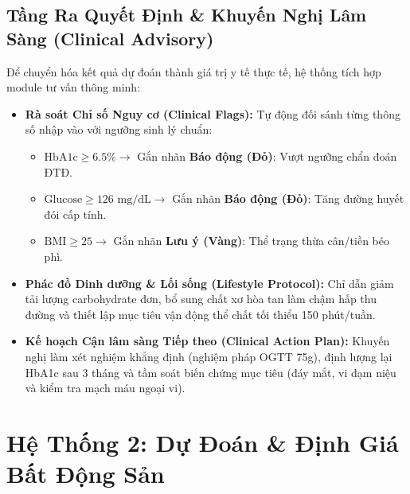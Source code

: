 \documentclass[12pt,a4paper]{report}
\begin{document}
\section{Tầng Ra Quyết Định \& Khuyến Nghị Lâm Sàng (Clinical Advisory)}
Để chuyển hóa kết quả dự đoán thành giá trị y tế thực tế, hệ thống tích hợp module tư vấn thông minh:
\begin{itemize}[leftmargin=2em]
    \item \textbf{Rà soát Chỉ số Nguy cơ (Clinical Flags):} Tự động đối sánh từng thông số nhập vào với ngưỡng sinh lý chuẩn:
    \begin{itemize}
        \item $\text{HbA1c} \ge 6.5\% \rightarrow$ Gắn nhãn \textbf{Báo động (Đỏ)}: Vượt ngưỡng chẩn đoán ĐTĐ.
        \item $\text{Glucose} \ge 126\text{ mg/dL} \rightarrow$ Gắn nhãn \textbf{Báo động (Đỏ)}: Tăng đường huyết đói cấp tính.
        \item $\text{BMI} \ge 25 \rightarrow$ Gắn nhãn \textbf{Lưu ý (Vàng)}: Thể trạng thừa cân/tiền béo phì.
    \end{itemize}
    \item \textbf{Phác đồ Dinh dưỡng \& Lối sống (Lifestyle Protocol):} Chỉ dẫn giảm tải lượng carbohydrate đơn, bổ sung chất xơ hòa tan làm chậm hấp thu đường và thiết lập mục tiêu vận động thể chất tối thiểu 150 phút/tuần.
    \item \textbf{Kế hoạch Cận lâm sàng Tiếp theo (Clinical Action Plan):} Khuyến nghị làm xét nghiệm khẳng định (nghiệm pháp OGTT 75g), định lượng lại HbA1c sau 3 tháng và tầm soát biến chứng mục tiêu (đáy mắt, vi đạm niệu và kiểm tra mạch máu ngoại vi).
\end{itemize}

\chapter{Hệ Thống 2: Dự Đoán \& Định Giá Bất Động Sản}
\end{document}
